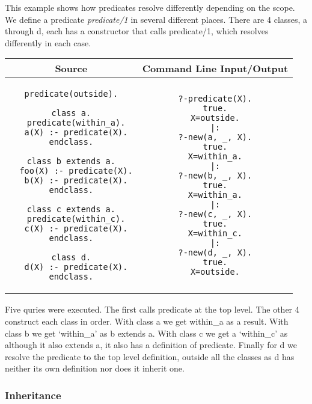 \documentclass[12pt,a4paper,twoside,openright]{report}
\begin{document}
This example shows how predicates resolve differently depending on the scope. We define a predicate \emph{predicate/1} in several different places. There are 4 classes, a through d, each has a constructor that calls predicate/1, which resolves differently in each case.

	\begin{center}
\begin{tabular}{c|c}
Source & Command Line Input/Output \\
\hline
	\small
\begin{lstlisting}
predicate(outside).

class a.
  predicate(within_a).
  a(X) :- predicate(X).
endclass.

class b extends a.
  foo(X) :- predicate(X).
  b(X) :- predicate(X).
endclass.

class c extends a.
  predicate(within_c).
  c(X) :- predicate(X).
endclass.

class d.
  d(X) :- predicate(X).
endclass.
\end{lstlisting}
&
	\small
\begin{lstlisting}
?-predicate(X).
true.
X=outside.
|:
?-new(a, _, X).
true.
X=within_a.
|:
?-new(b, _, X).
true.
X=within_a.
|:
?-new(c, _, X).
true.
X=within_c.
|:
?-new(d, _, X).
true.
X=outside.

\end{lstlisting}
\\
\end{tabular}
\end{center}

Five quries were executed. The first calls predicate at the top level. The other 4 construct each class in order. With class a we get within_a as a result. With class b we get `within_a' as b extends a. With class c we get a `within_c' as although it also extends a, it also has a definition of predicate. Finally for d we resolve the predicate to the top level definition, outside all the classes as d has neither its own definition nor does it inherit one.

\subsubsection{Inheritance}
	
\end{document}
